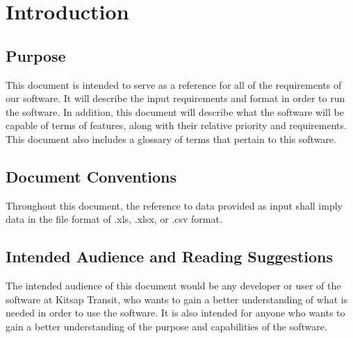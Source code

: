 \section{Introduction}

\subsection{Purpose}

This document is intended to serve as a reference for all of the requirements of our software. It will describe the input requirements and format in order to run the software. In addition, this document will describe what the software will be capable of terms of features, along with their relative priority and requirements. This document also includes a glossary of terms that pertain to this software.

\subsection{Document Conventions}

Throughout this document, the reference to data provided as input shall imply data in the file format of .xls, .xlsx, or .csv format.

\subsection{Intended Audience and Reading Suggestions}

The intended audience of this document would be any developer or user of the software at Kitsap Transit, who wants to gain a better understanding of what is needed in order to use the software. It is also intended for anyone who wants to gain a better understanding of the purpose and capabilities of the software.

